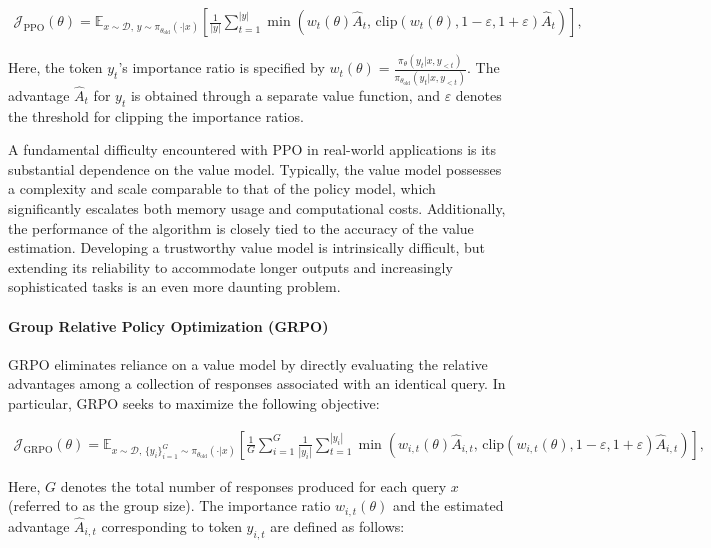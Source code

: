 \begin{align}
\mathcal{J}_\text{PPO}(\theta) = \mathbb{E}_{ x \sim \mathcal{D},\, y \sim \pi_{\theta_\text{old}}( \cdot | x) }
\left[ \frac{1}{|y|} \sum_{t=1}^{|y|} 
\min \left( w_{t}(\theta) \widehat{A}_{t},  \, \mathrm{clip} \left( w_{t}(\theta), 1 - {\varepsilon}, 1 + {\varepsilon}\right) \widehat{A}_{t} \right)
\right],
\end{align}

Here, the token $y_t$'s importance ratio is specified by $
w_{t}(\theta) = \frac{ \pi_{\theta} (y_{t} | x, y_{<t}) }{ \pi_{\theta_\text{old}} (y_{t} | x,y_{<t})} $. The advantage $\widehat{A}_{t}$ for $y_t$ is obtained through a separate value function, and $\varepsilon$ denotes the threshold for clipping the importance ratios.

A fundamental difficulty encountered with PPO in real-world applications is its substantial dependence on the value model. Typically, the value model possesses a complexity and scale comparable to that of the policy model, which significantly escalates both memory usage and computational costs. Additionally, the performance of the algorithm is closely tied to the accuracy of the value estimation. Developing a trustworthy value model is intrinsically difficult, but extending its reliability to accommodate longer outputs and increasingly sophisticated tasks is an even more daunting problem.

\paragraph{Group Relative Policy Optimization (GRPO)} GRPO \citep{grpo} eliminates reliance on a value model by directly evaluating the relative advantages among a collection of responses associated with an identical query. In particular, GRPO seeks to maximize the following objective:

\begin{align}
\label{equ:grpo}
\mathcal{J}_\text{GRPO}(\theta) = \mathbb{E}_{ x \sim \mathcal{D},\, \{y_i\}_{i=1}^G \sim \pi_{\theta_\text{old}}( \cdot | x) }
\left[ \frac{1}{G} \sum_{i=1}^{G} \frac{1}{|y_i|} \sum_{t=1}^{|y_i|} 
\min \left( w_{i,t}(\theta) \widehat{A}_{i,t},  \, \mathrm{clip} \left( w_{i,t}(\theta), 1 - {\varepsilon}, 1 + {\varepsilon}\right) \widehat{A}_{i,t} \right)
\right],
\end{align}

Here, $G$ denotes the total number of responses produced for each query $x$ (referred to as the group size). The importance ratio $w_{i,t}(\theta)$ and the estimated advantage $\widehat{A}_{i,t}$ corresponding to token $y_{i,t}$ are defined as follows:

